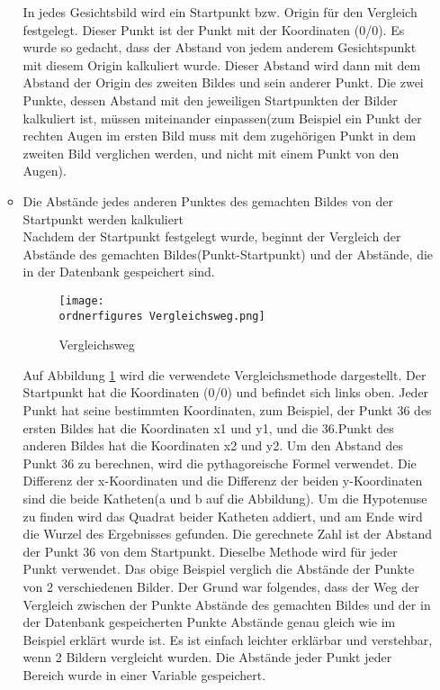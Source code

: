 \begin{enumerate}
\begin{itemize}
	In jedes Gesichtsbild wird ein Startpunkt bzw. Origin für den Vergleich festgelegt. Dieser Punkt ist der Punkt mit der Koordinaten (0/0). Es wurde so gedacht, dass der Abstand von jedem anderem Gesichtspunkt mit diesem Origin kalkuliert wurde. Dieser Abstand wird dann mit dem Abstand der Origin des zweiten Bildes und sein anderer Punkt. Die zwei Punkte, dessen Abstand mit den jeweiligen Startpunkten der Bilder kalkuliert ist, müssen miteinander einpassen(zum Beispiel ein Punkt der rechten Augen im ersten Bild muss mit dem zugehörigen Punkt in dem zweiten Bild verglichen werden, und nicht mit einem Punkt von den Augen).
	\item Die Abstände jedes anderen Punktes des gemachten Bildes von der Startpunkt werden kalkuliert \\
	Nachdem der Startpunkt festgelegt wurde, beginnt der Vergleich der Abstände des gemachten Bildes(Punkt-Startpunkt) und der Abstände, die in der Datenbank gespeichert sind.
	
	
	\begin{figure}[H]
		\centering
		\texttt{[image: \\ordnerfigures Vergleichsweg.png]}
		\caption{Vergleichsweg}
		\label{fig:Vergleichsweg}
	\end{figure}
	
	Auf Abbildung \ref{fig:Vergleichsweg} wird die verwendete Vergleichsmethode dargestellt. Der Startpunkt hat die Koordinaten (0/0) und befindet sich links oben. Jeder Punkt hat seine bestimmten Koordinaten, zum Beispiel, der Punkt 36 des ersten Bildes hat die Koordinaten x1 und y1, und die 36.Punkt des anderen Bildes hat die Koordinaten x2 und y2. Um den Abstand des Punkt 36 zu berechnen, wird die pythagoreische Formel verwendet. Die Differenz der x-Koordinaten und die Differenz der beiden y-Koordinaten sind die beide Katheten(a und b auf die Abbildung). Um die Hypotenuse zu finden wird das Quadrat beider Katheten addiert, und am Ende wird die Wurzel des Ergebnisses gefunden. Die gerechnete Zahl ist der Abstand der Punkt 36 von dem Startpunkt. Dieselbe Methode wird für jeder Punkt verwendet.
	Das obige Beispiel verglich die Abstände der Punkte von 2 verschiedenen Bilder. Der Grund war folgendes, dass der Weg der Vergleich zwischen der Punkte Abstände des gemachten Bildes und der in der Datenbank gespeicherten Punkte Abstände genau gleich wie im Beispiel erklärt wurde ist. Es ist einfach leichter erklärbar und verstehbar, wenn 2 Bildern vergleicht wurden. 
	Die Abstände jeder Punkt jeder Bereich wurde in einer Variable gespeichert.\\
	

\end{itemize}
\end{enumerate}
